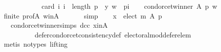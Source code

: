 \begin{isabellebody}
\ \ \ \ \ \ \ \ \ \ \ \ card\ {\isacharbraceleft}{\kern0pt}i{\isachardot}{\kern0pt}\ i\ {\isacharless}{\kern0pt}\ length\ p\ {\isasymand}\ {\isacharparenleft}{\kern0pt}y{\isacharcomma}{\kern0pt}\ w{\isacharparenright}{\kern0pt}\ {\isasymin}\ {\isacharparenleft}{\kern0pt}p{\isacharbang}{\kern0pt}i{\isacharparenright}{\kern0pt}{\isacharbraceright}{\kern0pt}{\isachardoublequoteclose}\isanewline
\ \ \isamarkupfalse%
\ {\isachardoublequoteopen}condorcet{\isacharunderscore}{\kern0pt}winner\ A\ p\ w{\isachardoublequoteclose}\isanewline
\ \ \ \ \isamarkupfalse%
\ finite\ prof{\isacharunderscore}{\kern0pt}A\ w{\isacharunderscore}{\kern0pt}in{\isacharunderscore}{\kern0pt}A\ {\isachardoublequoteopen}{}{\isachardoublequoteclose}\isanewline
\ \ \ \ \isamarkupfalse%
\ simp\isanewline
\ \ \isamarkupfalse%
\ {\isachardoublequoteopen}x\ {\isasymin}\ elect\ m\ A\ p{\isachardoublequoteclose}\isanewline
\ \ \ \ \isamarkupfalse%
\ {\isachardoublequoteopen}{}{\isachardoublequoteclose}\ {\isachardoublequoteopen}{}{\isachardoublequoteclose}\ condorcet{\isacharunderscore}{\kern0pt}winner{\isachardot}{\kern0pt}simps\ dcc\ x{\isacharunderscore}{\kern0pt}in{\isacharunderscore}{\kern0pt}A\isanewline
\ \ \ \ \ \ \ \ \ \ defer{\isacharunderscore}{\kern0pt}condorcet{\isacharunderscore}{\kern0pt}consistency{\isacharunderscore}{\kern0pt}def\ electoral{\isacharunderscore}{\kern0pt}mod{\isacharunderscore}{\kern0pt}defer{\isacharunderscore}{\kern0pt}elem\isanewline
\ \ \ \ \isamarkupfalse%
\ {\isacharparenleft}{\kern0pt}metis\ {\isacharparenleft}{\kern0pt}no{\isacharunderscore}{\kern0pt}types{\isacharcomma}{\kern0pt}\ lifting{\isacharparenright}{\kern0pt}{\isacharparenright}{\kern0pt}\isanewline
{}\isamarkupfalse%
%
\endisatagproof
{\isafoldproof}%
%
\isadelimproof
\isanewline
%
\endisadelimproof
%
\isadelimtheory
\isanewline
%
\endisadelimtheory
%
\isatagtheory
{}\isamarkupfalse%
%
\endisatagtheory
{\isafoldtheory}%
%
\isadelimtheory
%
\endisadelimtheory
%
\end{isabellebody}%
\endinput
